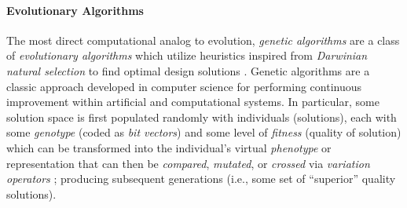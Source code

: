 \documentclass{evolang12}
\begin{document}
\paragraph{Evolutionary Algorithms}
The most direct computational analog to evolution, \textit{genetic algorithms} are a class of \textit{evolutionary algorithms} which utilize heuristics inspired from \textit{Darwinian natural selection} to find optimal design solutions \cite{kwong2001optimisation}. Genetic algorithms are a classic approach developed in computer science for performing continuous improvement within artificial and computational systems. In particular, some solution space is first populated randomly with individuals (solutions), each with some \textit{genotype} (coded as \textit{bit vectors}) and some level of \textit{fitness} (quality of solution) which can be transformed into the individual's virtual \textit{phenotype} or representation that can then be \textit{compared}, \textit{mutated}, or \textit{crossed} via \textit{variation operators} \cite{chau1997optimization}; producing subsequent generations (i.e., some set of \enquote{superior} quality solutions).

\end{document}
